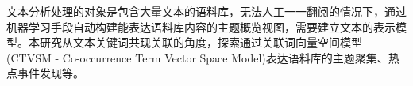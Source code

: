 
文本分析处理的对象是包含大量文本的语料库，无法人工一一翻阅的情况下，通过机器学习手段自动构建能表达语料库内容的主题概览视图，需要建立文本的表示模型。本研究从文本关键词共现关联的角度，探索通过关联词向量空间模型(CTVSM - Co-occurrence Term Vector Space Model)表达语料库的主题聚集、热点事件发现等。
